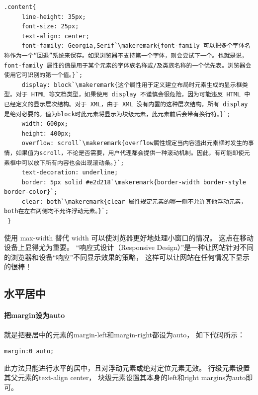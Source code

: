 \documentclass{book}
\newcounter{coderemarks}   %
\newcounter{codevar}     %
\newcommand{\circlemark}[1]{%
\tikz\node[text=white,font=\sffamily\bfseries,inner sep=0.2mm,draw,circle,fill=black]{#1};}
\newcommand{\makeremark}[1]{%
\circlemark{\arabic{coderemarks}}%
\global \expandafter\def \csname codebox\the\value{coderemarks}\endcsname{#1}%
\stepcounter{coderemarks}}
\newcommand{\showremarks}{%
\begin{list}{\circlemark{\arabic{codevar}}} %
{} %
\whiledo{\value{codevar} < \value{coderemarks}}{ %
\item \expandafter\csname codebox\the\value{codevar}\endcsname %
\stepcounter{codevar}} %
\end{list} %
\setcounter{coderemarks}{1}%
\setcounter{codevar}{1}%
}
\begin{document}
\begin{lstlisting}[caption=CSS代码标签示例,label={code:CSSLearingLabel}]
 .content{
     line-height: 35px;
     font-size: 25px;
     text-align: center;            
     font-family: Georgia,Serif`\makeremark{font-family 可以把多个字体名称作为一个“回退”系统来保存。如果浏览器不支持第一个字体，则会尝试下一个。也就是说，font-family 属性的值是用于某个元素的字体族名称或/及类族名称的一个优先表。浏览器会使用它可识别的第一个值。}`; 
     display: block`\makeremark{这个属性用于定义建立布局时元素生成的显示框类型。对于 HTML 等文档类型，如果使用 display 不谨慎会很危险，因为可能违反 HTML 中已经定义的显示层次结构。对于 XML，由于 XML 没有内置的这种层次结构，所有 display 是绝对必要的。值为block时此元素将显示为块级元素，此元素前后会带有换行符。}`;
     width: 600px;
     height: 400px;
     overflow: scroll`\makeremark{overflow属性规定当内容溢出元素框时发生的事情，如果值为scroll，不论是否需要，用户代理都会提供一种滚动机制。因此，有可能即使元素框中可以放下所有内容也会出现滚动条。}`;
     text-decoration: underline;
     border: 5px solid #e2d218`\makeremark{border-width border-style border-color}`;
     clear: both`\makeremark{clear 属性规定元素的哪一侧不允许其他浮动元素，both在左右两侧均不允许浮动元素。}`;          
 }
\end{lstlisting}

\showremarks

使用 max-width 替代 width 可以使浏览器更好地处理小窗口的情况。
这点在移动设备上显得尤为重要。
“响应式设计（Responsive Design）”是一种让网站针对不同的浏览器和设备“响应”不同显示效果的策略，
这样可以让网站在任何情况下显示的很棒！ 


\subsection{水平居中}

\paragraph{把margin设为auto}

就是把要居中的元素的margin-left和margin-right都设为auto，
如下代码所示：

\begin{lstlisting}
margin:0 auto;
\end{lstlisting}

此方法只能进行水平的居中，且对浮动元素或绝对定位元素无效。
行级元素设置其父元素的text-align center，
块级元素设置其本身的left和right margins为auto即可。
\end{document}
